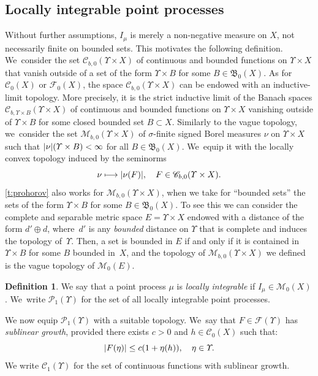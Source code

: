 \documentclass[JEP,XML,SOM,Unicode,published]{cedram}
\newcommand\mto{\mathchoice{\longmapsto}{\mapsto}{\mapsto}{\mapsto}}
\theoremstyle{definition}
\newtheorem{definition}[theorem]{Definition}
\theoremstyle{remark}
\DeclarePairedDelimiter{\abs}{\lvert}{\rvert}
\begin{document}
\subsection{Locally integrable point processes}\label{s:locally-integrable}
Without further assumptions, $I_{\mu}$ is merely a non-negative measure on $X$, not necessarily finite on bounded sets.
This motivates the following definition. We~consider the set $\mathscr{C}_{b,0}(\varUpsilon \times X)$ of continuous and bounded functions on $\varUpsilon \times X$ that vanish outside of a set of the form $\varUpsilon \times B$ for some $B \in \mathfrak{B}_{0}(X)$.
As for $\mathscr{C}_{0}(X)$ or $\mathscr{F}_{0}(X)$, the space $\mathscr{C}_{b,0}(\varUpsilon \times X)$ can be endowed with an inductive-limit topology.
More precisely, it is the strict inductive limit of the Banach spaces $\mathscr{C}_{b,\varUpsilon \times B}(\varUpsilon \times X)$ of continuous and bounded functions on $\varUpsilon \times X$ vanishing outside of $\varUpsilon \times B$ for some closed bounded set $B \subset X$.
Similarly to the vague topology, we~consider the set $\mathscr{M}_{b,0}(\varUpsilon \times X)$ of $\sigma$-finite signed Borel measures $\nu$ on $\varUpsilon \times X$ such that $\abs{\nu}(\varUpsilon \times B) < \infty$ for all $B \in \mathfrak{B}_{0}(X)$. We~equip it with the locally convex topology induced by the seminorms
\begin{equation*}
\nu \mto \abs{\nu(F)}, \quad F \in \mathscr{C}_{b,0}(\varUpsilon \times X).
\end{equation*}
\cref{t:prohorov} also works for $\mathscr{M}_{b,0}(\varUpsilon \times X)$, when we take for \enquote{bounded sets} the sets of the form $\varUpsilon \times B$ for some $B \in \mathfrak{B}_{0}(X)$.
To see this we can consider the complete and separable metric space $E = \varUpsilon \times X$ endowed with a distance of the form $d' \oplus d$, where~$d'$ is any \emph{bounded} distance on $\varUpsilon$ that is complete and induces the topology of~$\varUpsilon$.
Then, a set is bounded in $E$ if and only if it is contained in $\varUpsilon \times B$ for some $B$ bounded in~$X$, and the topology of $\mathscr{M}_{b,0}(\varUpsilon \times X)$ we defined is the vague topology of $\mathscr{M}_{0}(E)$.

\begin{definition}
We say that a point process $\mu$ is \emph{locally integrable} if $I_{\mu} \in \mathscr{M}_{0}(X)$. We~write $\mathscr{P}_{1}(\varUpsilon)$ for the set of all locally integrable point processes.
\end{definition}
We now equip $\mathscr{P}_{1}(\varUpsilon)$ with a suitable topology. We~say that $F \in \mathscr{F}(\varUpsilon)$ has \emph{sublinear growth}, provided there exists $c > 0$ and $h \in \mathscr{C}_{0}(X)$ such that:
\begin{equation*}
\abs{F(\eta)} \leq c (1 + \eta(h)), \quad \eta \in \varUpsilon.
\end{equation*}
We write $\mathscr{C}_{1}(\varUpsilon)$ for the set of continuous functions with sublinear growth.
\end{document}
